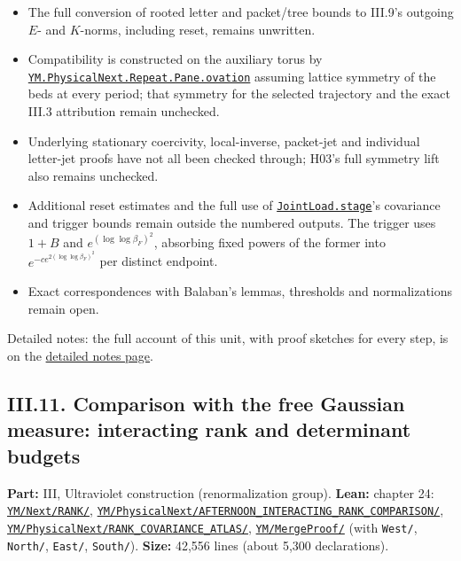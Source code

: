 \documentclass[
  letterpaper,
  11pt]{article}
\providecommand{\tightlist}{%
  \setlength{\itemsep}{0pt}\setlength{\parskip}{0pt}}
\begin{document}
\begin{itemize}
\tightlist
\item
  The full conversion of rooted letter and packet/tree bounds to III.9's
  outgoing \(E\)- and \(K\)-norms, including reset, remains unwritten.
\item
  Compatibility is constructed on the auxiliary torus by
  \href{https://github.com/yang-mills-group/OpenAI-YM-20261028/blob/3456e5e75cf8d4cd558955a5c7638fba2d68f464/YM/PhysicalNext/RG_NEXT_COMPLETE_REPEATABLE_NONLINEAR_STEP/Pane/Rooms.lean\#L39-L41}{\texttt{YM.PhysicalNext.Repeat.Pane.ovation}}
  assuming lattice symmetry of the beds at every period; that symmetry
  for the selected trajectory and the exact III.3 attribution remain
  unchecked.
\item
  Underlying stationary coercivity, local-inverse, packet-jet and
  individual letter-jet proofs have not all been checked through; H03's
  full symmetry lift also remains unchecked.
\item
  Additional reset estimates and the full use of
  \href{https://github.com/yang-mills-group/OpenAI-YM-20261028/blob/3456e5e75cf8d4cd558955a5c7638fba2d68f464/YM/PhysicalNext/V9_JOINT_ENDPOINT_LOAD/Supply.lean\#L72-L98}{\texttt{JointLoad.stage}}'s
  covariance and trigger bounds remain outside the numbered outputs. The
  trigger uses \(1+B\) and \(e^{(\log\log\beta_F)^2}\), absorbing fixed
  powers of the former into \(e^{-c e^{2(\log\log\beta_F)^2}}\) per
  distinct endpoint.
\item
  Exact correspondences with Balaban's lemmas, thresholds and
  normalizations remain open.
\end{itemize}

Detailed notes: the full account of this unit, with proof sketches for
every step, is on the
\href{https://github.com/scottnarmstrong/yang-mills-informalization/blob/main/outline/notes/III-10.md}{detailed
notes page}.

\subsection{III.11. Comparison with the free Gaussian measure:
interacting rank and determinant
budgets}\label{iii.11.-comparison-with-the-free-gaussian-measure-interacting-rank-and-determinant-budgets}

\textbf{Part:} III, Ultraviolet construction (renormalization group).
\textbf{Lean:} chapter 24:
\href{https://github.com/yang-mills-group/OpenAI-YM-20261028/tree/3456e5e75cf8d4cd558955a5c7638fba2d68f464/YM/Next/RANK}{\texttt{YM/Next/RANK/}},
\href{https://github.com/yang-mills-group/OpenAI-YM-20261028/tree/3456e5e75cf8d4cd558955a5c7638fba2d68f464/YM/PhysicalNext/AFTERNOON_INTERACTING_RANK_COMPARISON}{\texttt{YM/PhysicalNext/AFTERNOON\_INTERACTING\_RANK\_COMPARISON/}},
\href{https://github.com/yang-mills-group/OpenAI-YM-20261028/tree/3456e5e75cf8d4cd558955a5c7638fba2d68f464/YM/PhysicalNext/RANK_COVARIANCE_ATLAS}{\texttt{YM/PhysicalNext/RANK\_COVARIANCE\_ATLAS/}},
\href{https://github.com/yang-mills-group/OpenAI-YM-20261028/tree/3456e5e75cf8d4cd558955a5c7638fba2d68f464/YM/MergeProof}{\texttt{YM/MergeProof/}}
(with \texttt{West/}, \texttt{North/}, \texttt{East/}, \texttt{South/}).
\textbf{Size:} 42,556 lines (about 5,300 declarations).
\end{document}
